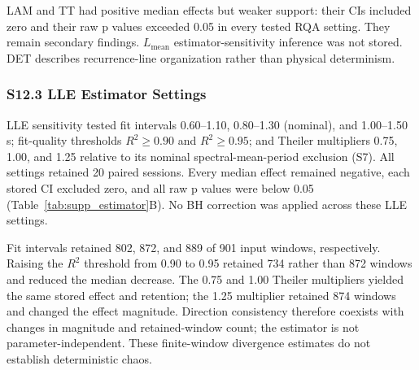 LAM and TT had positive median effects but weaker support: their CIs included zero and their raw p values exceeded 0.05 in every tested RQA setting. They remain secondary findings. $L_{\mathrm{mean}}$ estimator-sensitivity inference was not stored. DET describes recurrence-line organization rather than physical determinism.

\subsubsection*{S12.3 LLE Estimator Settings}
LLE sensitivity tested fit intervals 0.60--1.10, 0.80--1.30 (nominal), and 1.00--1.50 s; fit-quality thresholds $R^2\geq0.90$ and $R^2\geq0.95$; and Theiler multipliers 0.75, 1.00, and 1.25 relative to its nominal spectral-mean-period exclusion (S7). All settings retained 20 paired sessions. Every median effect remained negative, each stored CI excluded zero, and all raw p values were below 0.05 (Table~\ref{tab:supp_estimator}B). No BH correction was applied across these LLE settings.

Fit intervals retained 802, 872, and 889 of 901 input windows, respectively. Raising the $R^2$ threshold from 0.90 to 0.95 retained 734 rather than 872 windows and reduced the median decrease. The 0.75 and 1.00 Theiler multipliers yielded the same stored effect and retention; the 1.25 multiplier retained 874 windows and changed the effect magnitude. Direction consistency therefore coexists with changes in magnitude and retained-window count; the estimator is not parameter-independent. These finite-window divergence estimates do not establish deterministic chaos.

